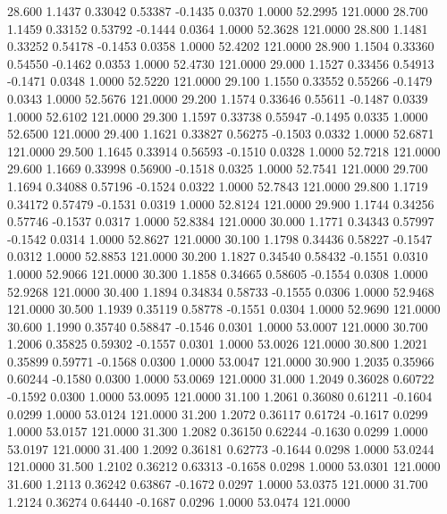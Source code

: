   28.600   1.1437   0.33042   0.53387  -0.1435   0.0370   1.0000  52.2995 121.0000
  28.700   1.1459   0.33152   0.53792  -0.1444   0.0364   1.0000  52.3628 121.0000
  28.800   1.1481   0.33252   0.54178  -0.1453   0.0358   1.0000  52.4202 121.0000
  28.900   1.1504   0.33360   0.54550  -0.1462   0.0353   1.0000  52.4730 121.0000
  29.000   1.1527   0.33456   0.54913  -0.1471   0.0348   1.0000  52.5220 121.0000
  29.100   1.1550   0.33552   0.55266  -0.1479   0.0343   1.0000  52.5676 121.0000
  29.200   1.1574   0.33646   0.55611  -0.1487   0.0339   1.0000  52.6102 121.0000
  29.300   1.1597   0.33738   0.55947  -0.1495   0.0335   1.0000  52.6500 121.0000
  29.400   1.1621   0.33827   0.56275  -0.1503   0.0332   1.0000  52.6871 121.0000
  29.500   1.1645   0.33914   0.56593  -0.1510   0.0328   1.0000  52.7218 121.0000
  29.600   1.1669   0.33998   0.56900  -0.1518   0.0325   1.0000  52.7541 121.0000
  29.700   1.1694   0.34088   0.57196  -0.1524   0.0322   1.0000  52.7843 121.0000
  29.800   1.1719   0.34172   0.57479  -0.1531   0.0319   1.0000  52.8124 121.0000
  29.900   1.1744   0.34256   0.57746  -0.1537   0.0317   1.0000  52.8384 121.0000
  30.000   1.1771   0.34343   0.57997  -0.1542   0.0314   1.0000  52.8627 121.0000
  30.100   1.1798   0.34436   0.58227  -0.1547   0.0312   1.0000  52.8853 121.0000
  30.200   1.1827   0.34540   0.58432  -0.1551   0.0310   1.0000  52.9066 121.0000
  30.300   1.1858   0.34665   0.58605  -0.1554   0.0308   1.0000  52.9268 121.0000
  30.400   1.1894   0.34834   0.58733  -0.1555   0.0306   1.0000  52.9468 121.0000
  30.500   1.1939   0.35119   0.58778  -0.1551   0.0304   1.0000  52.9690 121.0000
  30.600   1.1990   0.35740   0.58847  -0.1546   0.0301   1.0000  53.0007 121.0000
  30.700   1.2006   0.35825   0.59302  -0.1557   0.0301   1.0000  53.0026 121.0000
  30.800   1.2021   0.35899   0.59771  -0.1568   0.0300   1.0000  53.0047 121.0000
  30.900   1.2035   0.35966   0.60244  -0.1580   0.0300   1.0000  53.0069 121.0000
  31.000   1.2049   0.36028   0.60722  -0.1592   0.0300   1.0000  53.0095 121.0000
  31.100   1.2061   0.36080   0.61211  -0.1604   0.0299   1.0000  53.0124 121.0000
  31.200   1.2072   0.36117   0.61724  -0.1617   0.0299   1.0000  53.0157 121.0000
  31.300   1.2082   0.36150   0.62244  -0.1630   0.0299   1.0000  53.0197 121.0000
  31.400   1.2092   0.36181   0.62773  -0.1644   0.0298   1.0000  53.0244 121.0000
  31.500   1.2102   0.36212   0.63313  -0.1658   0.0298   1.0000  53.0301 121.0000
  31.600   1.2113   0.36242   0.63867  -0.1672   0.0297   1.0000  53.0375 121.0000
  31.700   1.2124   0.36274   0.64440  -0.1687   0.0296   1.0000  53.0474 121.0000
